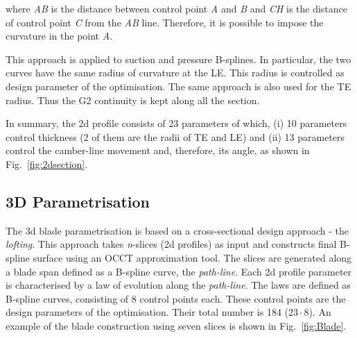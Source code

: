 \documentclass[9pt,academicons]{article}
\begin{document}
\noindent
where \textit{AB} is the distance between control point \textit{A} and \textit{B} and \textit{CH} is the distance of control point \textit{C} from the \textit{AB} line.
Therefore, it is possible to impose the curvature in the point \textit{A}.

This approach is applied to suction and pressure B-splines. In particular, the two curves have the same radius of curvature at the LE. This radius is controlled as design parameter of the optimisation. The same approach is also used for the TE radius. Thus the G2 continuity is kept along all the section. 

In summary, the 2d profile consists of 23 parameters of which, (i) 10 parameters control thickness (2 of them are the radii of TE and LE) and (ii) 13 parameters control the camber-line movement and, therefore, its angle, as shown in Fig.~\ref{fig:2dsection}.



\subsection{3D Parametrisation}
The 3d blade parametrisation is based on a cross-sectional design approach - the \textit{lofting}. This approach takes \textit{n}-slices (2d profiles) as input and constructs final B-spline surface using an OCCT approximation tool. The slices are generated along a blade span defined as a B-spline curve, the \textit{path-line}. Each 2d profile parameter is characterised by a law of evolution along the \textit{path-line}. The laws are defined as B-spline curves, consisting of 8 control points each. These control points are the design parameters of the optimisation. Their total number is 184 ($23 \cdot 8$). An example of the blade construction using seven slices is shown in Fig.~\ref{fig:Blade}.

\end{document}
